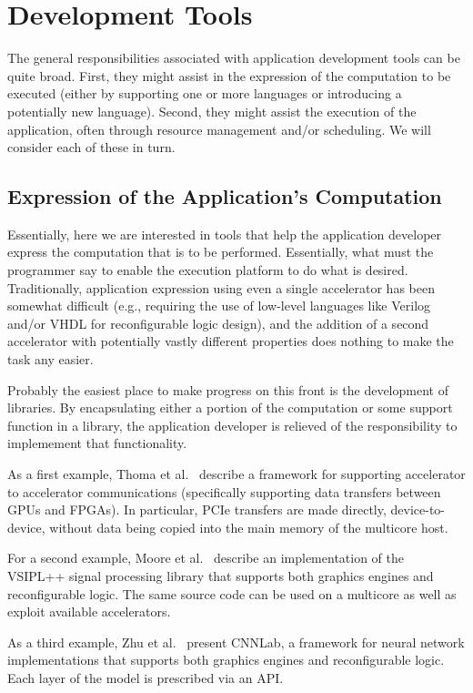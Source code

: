 \section{Development Tools}
\label{sec:dev}

The general responsibilities associated with application development
tools can be quite broad.  First, they might assist in the expression of
the computation to be executed (either by supporting one or more languages
or introducing a potentially new language).  Second, they might assist the
execution of the application, often through resource management and/or
scheduling.  We will consider each of these in turn.

\subsection{Expression of the Application's Computation}

Essentially, here we are interested in tools that help the application
developer express the computation that is to be performed. Essentially, what
must the programmer say to enable the execution platform to do what is
desired.  Traditionally, application expression using even a single
accelerator has been somewhat difficult (e.g., requiring the use of
low-level languages like Verilog and/or VHDL for reconfigurable logic
design), and the addition of a second accelerator with potentially vastly
different properties does nothing to make the task any easier.

Probably the easiest place to make progress on this front is the
development of libraries.  By encapsulating either a portion of the
computation or some support function in a library, the application
developer is relieved of the responsibility to implemement that functionality.

As a first example, Thoma et al.~\cite{tdmp15} describe a framework for
supporting accelerator to accelerator communications (specifically supporting
data transfers between GPUs and FPGAs).  In particular, PCIe transfers
are made directly, device-to-device, without data being copied into
the main memory of the multicore host. 

For a second example, Moore et al.~\cite{mlk12} describe an implementation
of the VSIPL++ signal processing library that supports both graphics engines
and reconfigurable logic. The same source code can be used on a multicore
as well as exploit available accelerators.

As a third example, Zhu et al.~\cite{zlwx16} present CNNLab, a framework
for neural network implementations that supports both graphics engines
and reconfigurable logic. Each layer of the model is prescribed via an API.

